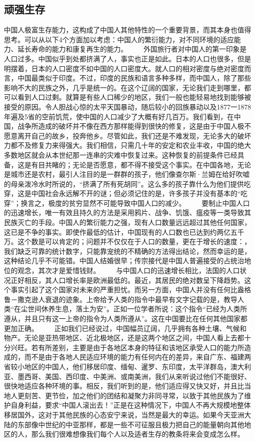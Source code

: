 \documentclass[12pt,oneside]{book}
\begin{document}
\begin{common-format}
\chapter{顽强生存}
中国人极富生存能力，这构成了中国人其他特性的一个重要背景，而其本身也值得思考。可以从以下4个方面加以考虑：中国人的繁衍能力，对不同环境的适应能力、延长寿命的能力和康复再生的能力。 
　　外国旅行者对中国人的第一印象是人口过多。中国似乎到处都挤满了人，事实也正是如此。日本的人口也很多，但是明摆着，日本的人口密度不如中国的人口密度大。就人口的相对密度与绝对密度而言，中国最类似于印度。不过，印度的民族和语言多种多样，而中国人，除了那些影响不大的民族之外，几乎是统一的。在这个辽阔的国家，无论我们走到哪里，都可以看到人口过剩。就算是有些人口稀少的地区，我们一般也能轻易地找到能够被接受的原因。令人胆战心惊的太平天国暴动，随后较小的回族暴动以及1877一1878年遍及5省的空前饥荒，使中国的人口减少了大概有好几百万。我们看到，在中国，战争所造成的破坏并不像在西方那样能得到很快的修复，这是由于中国人极不愿意离开自己的故乡，投奔他乡。尽管如此，我们还是不难发现，无论多大的破坏力都不及修复力来得强大。我们相信，只需几十年的安定和农业丰收，中国的绝大多数地区就会从本世纪那一连串的灾难中恢复过来。这种恢复的前提条件已经具备，这是有目共睹的；无论是否愿意，都不得不接受这个事实。在中国各地，无论是城市还是农村，最引人注目的是一群群的孩子，他们像查尔斯·兰姆在给好吹嘘的母亲泼冷水时所说的，“挤满了所有死胡同”。这么多的孩子靠什么为他们提供吃穿，这是中国社会永远解不开的谜；但必须记住的是，许多孩子并没有基本的“吃穿”；换言之，极度的贫穷显然不可能导致中国人口的减少。 
　　要制止中国人口的迅速增长，唯一有效且持久的方法是采用鸦片、战争、饥饿、瘟疫等一类导致其民族灭亡的手段。中国人的繁衍能力之强，现有人口数量远远超过其他任何国家，这已是不争的事实。即使作最低的估计，中国现有的人口数也已达到约两亿五千万。这个数是可以肯定的；问题并不仅仅在于人口的数量，更在于增长的速度：，我们缺乏可靠的统计数字，只能靠宠统的不精确的方法得出结论，然而幸运的是，这种结论几乎不可能错。中国人结婚很早；传宗接代是中国人普遍接受的占统治地位的观念，其次才是爱惜钱财。 
　　与中国人口的迅速增长相比，法国的人口状况正好相反，其人口增长率是欧洲最低的。最近，其居民的绝对数呈下降趋势。这个事实引起了这个国家对未来的严重担忧。而另一方面，中国人并没有任何比盎格鲁－撒克逊人衰退的迹象。上帝给予人类的指令中最早有文字记载的是，教导人类“在尘世间休养生息，落土为安”。正如一位学者所说：这个指令“已经为人类所遵从，并且只有这一上帝的指令为人类所遵从”。这在中国要比在任何其他国家都更加正确。 
　　正如我们已经说过，中国幅员辽阔，几乎拥有各种土壤、气候和物产。无论是亚热带地区、近北极地区，还是这两个地区之间，中国人看上去都十分兴旺。若有所差别，主要是由于各地区本身的特征和该地区承受人口的能力所造成的，而不是由于各地人民适应环境的能力有任何内在的差异，来自广东、福建两省较小地区的中国人，他们移居印度、缅甸、暹罗、东印度，太平洋群岛，澳大利亚、墨西哥、美国、西印度、中美洲、或南美洲，我们从来听说过他们不能很好、很快地适应各种环境的事。相反，我们听到的是，他们适应得又快又好，并且比当地人更刻苦、更节俭，加之他们的团结和凝聚力非同寻常，以致于其他民族为了维护自身利益，要求“中国人滚出去！”正是在这种情况下，中国人不再大规模地整体移居国外，这对于其他民族的心态安宁来说，当然是最大的幸运。如果今天亚洲大陆的东部像中世纪的中亚那样，都是一些不可征服且极力把自己的能量朝向其他地区的人，那么我们很难想像我们每个人以及适者生存的教条将来会变成怎么样。 

\end{common-format}
\end{document}

